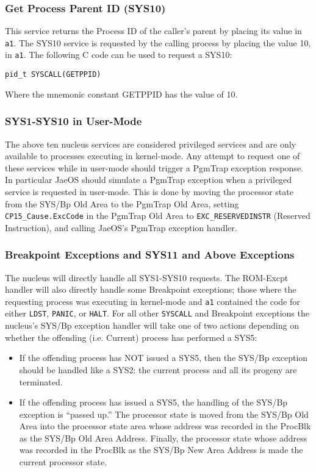 \subsubsection{Get Process Parent ID (SYS10)}
This service returns the Process ID of the caller's parent by placing its value in
\verb+a1+.
The SYS10 service is requested by the calling process by placing the value
10, in \verb+a1+.
The following C code can be used to request a SYS10:
\begin{verbatim}
pid_t SYSCALL(GETPPID)
\end{verbatim}
Where the mnemonic constant GETPPID has the value of 10.
\subsubsection{SYS1-SYS10 in User-Mode}
The above ten nucleus services are considered privileged services and are only
available to processes executing in kernel-mode. Any attempt to request one of
these services while in user-mode should trigger a PgmTrap exception response.
In particular JaeOS should simulate a PgmTrap exception when a privileged
service is requested in user-mode. This is done by moving the processor state
from the SYS/Bp Old Area to the PgmTrap Old Area, setting
\verb+CP15_Cause.ExcCode+ in
the PgmTrap Old Area to \verb+EXC_RESERVEDINSTR+ (Reserved Instruction), 
and calling JaeOS's PgmTrap exception handler.
\subsubsection{Breakpoint Exceptions and SYS11 and Above Exceptions}
The nucleus will directly handle all SYS1-SYS10 requests. The ROM-Excpt
handler will also directly handle some Breakpoint exceptions; those where
the requesting process was executing in kernel-mode and \verb+a1+ contained the code for
either \verb+LDST+, \verb+PANIC+, or \verb+HALT+.
For all other \verb+SYSCALL+ and Breakpoint exceptions the nucleus's SYS/Bp exception handler 
will take one of two actions depending on whether the offending
(i.e. Current) process has performed a SYS5:
\begin{itemize}
\item If the offending process has NOT issued a SYS5,
then the SYS/Bp exception should be handled like a SYS2: the current
process and all its progeny are terminated.
\item If the offending process has issued a SYS5, the handling of the SYS/Bp exception 
is “passed up.” The processor state is moved
from the SYS/Bp Old Area into the processor state area whose address was
recorded in the ProcBlk as the SYS/Bp Old Area Address. Finally, the processor 
state whose address was recorded in the ProcBlk as the SYS/Bp New
Area Address is made the current processor state.
\end{itemize}
